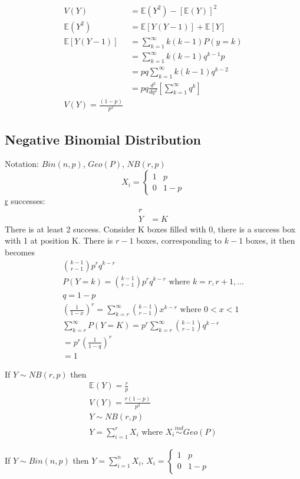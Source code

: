 \documentclass{article}
\begin{document}
\begin{align*}
    V(Y)               & = \mathbb{E}(Y^2) - [\mathbb{E}(Y)]^2         \\
    \mathbb{E}(Y^2)    & = \mathbb{E}[Y(Y-1)] + \mathbb{E}[Y]          \\
    \mathbb{E}[Y(Y-1)] & = \sum_{k=1}^{\infty}k(k-1)P(y=k)             \\
                       & = \sum_{k=1}^{\infty}k(k-1)q ^{k-1}p          \\
                       & = pq \sum_{k=1}^{\infty}k(k-1)q ^{k-2}        \\
                       & = pq \frac{d^2}{dq^2}[\sum_{k=1}^{\infty}q^k] \\
    V(Y) = \frac{(1-p)}{p^2}
\end{align*}

\subsection{Negative Binomial Distribution}
Notation: $Bin(n,p)$, $Geo(P)$, $NB(r,p)$
\[
    X_i = \begin{cases}
        1 & p   \\
        0 & 1-p
    \end{cases}
\]
\underline{r} successes:
\begin{align*}
    r       \\
    Y & = K
\end{align*}
There is at least 2 success. Consider K boxes filled with 0, there is a success box
with 1 at position K. There is $r-1$ boxes, corresponding to $k-1$ boxes, it then becomes
\begin{gather*}
    \binom{k-1}{r-1}p^rq ^{k-r}                                                        \\
    P(Y=k)             = \binom{k-1}{r-1}p^rq ^{k-r} \text{ where } k = r, r+1, \dots \\
    q                  = 1-p                                                          \\
    (\frac{1}{1-x})^r  = \sum_{k=r}^{\infty} \binom{k-1}{r-1} x ^{k-r} \text{ where }
    0 < x < 1 \\
    \boxed{ \sum_{k=r}^{\infty} P ( Y=K) = p^r \sum_{k=r}^{\infty}\binom{k-1}{r-1} q ^{k-r}} \\
    = p^r (\frac{1}{1-q})^r \\
    =1
\end{gather*}

If $Y \sim NB(r,p)$ then
\begin{gather*}
    \mathbb{E}(Y) = \frac{r}{p} \\
    V(Y) = \frac{r(1-p)}{p^2} \\
    Y \sim NB (r, p) \\
    Y = \sum_{i=1}^{r} X_i \text{ where } X_i \stackrel{ind}{\sim} Geo(P)
\end{gather*}

If $Y \sim Bin(n,p)$ then $Y = \sum_{i=1}^{n}X_i$,
$
    X_i = \begin{cases}
        1 & p   \\
        0 & 1-p
    \end{cases}
$
\end{document}
